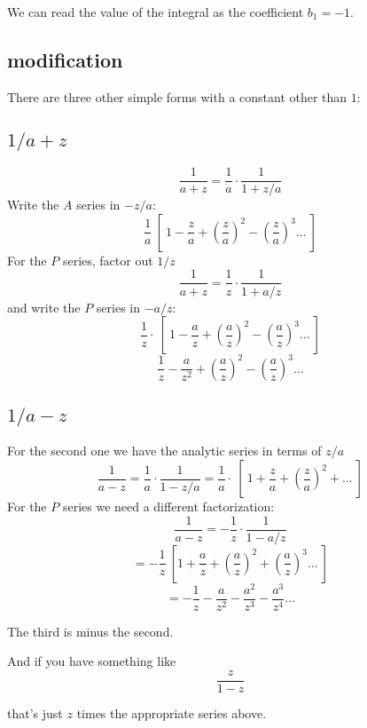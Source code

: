 \documentclass[11pt, oneside]{article}
\begin{document}
We can read the value of the integral as the coefficient $b_1 = -1$.

\subsection*{modification}

There are three other simple forms with a constant other than $1$:

\subsection*{$1/a + z$}

\label{sec:a_plus_z}

\[ \frac{1}{a + z} = \frac{1}{a} \cdot \frac{1}{1 + z/a} \]
Write the $A$ series in $-z/a$:
\[ \frac{1}{a} \ [ \ 1 -\frac{z}{a} + (\frac{z}{a})^2 - (\frac{z}{a})^3 \dots \ ] \]
For the $P$ series, factor out $1/z$
\[ \frac{1}{a + z} = \frac{1}{z} \cdot \frac{1}{1 + a/z} \]
and write the $P$ series in $-a/z$:
\[ \frac{1}{z} \cdot \ [ \ 1 - \frac{a}{z} + (\frac{a}{z})^2 - (\frac{a}{z})^3 \dots \ ] \]
\[ \frac{1}{z} - \frac{a}{z^2} + (\frac{a}{z})^2 - (\frac{a}{z})^3 \dots  \]

\subsection*{$1/a - z$}

\label{sec:a_minus_z}

For the second one we have the analytic series in terms of $z/a$ 
\[ \frac{1}{a - z} = \frac{1}{a} \cdot \frac{1}{1 - z/a} = \frac{1}{a} \cdot \ [ \ 1 +  \frac{z}{a} + (\frac{z}{a})^2 + \dots \ ] \]
For the $P$ series we need a different factorization:
\[ \frac{1}{a - z} = -\frac{1}{z} \cdot \frac{1}{1 - a/z} \]
\[ = -\frac{1}{z} \ [ 1 +  \frac{a}{z} + (\frac{a}{z})^2 + (\frac{a}{z})^3 \dots \ ]  \]
\[ = -\frac{1}{z} - \frac{a}{z^2} - \frac{a^2}{z^3} - \frac{a^3}{z^4} \dots  \]

The third is minus the second.

\label{sec:z_minus_a}

And if you have something like
\[ \frac{z}{1 - z} \]

that's just $z$ times the appropriate series above.
\end{document}
